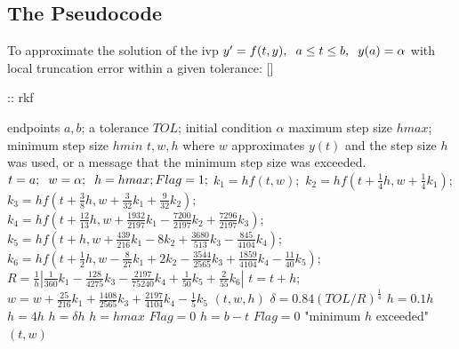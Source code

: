\documentclass[12pt,oneside]{book}
\begin{document}
\begin{spacing}{1.2}
			\subsection*{The Pseudocode} 
				To approximate the solution of the \ac{ivp}  $ y' = f(t,y), \hspace*{0.2cm} a \leq t \leq b, \hspace*{0.2cm} y(a) = \alpha $
				with local truncation error within a given tolerance: []
				
				\begin{algorithm}[H]
					\caption{:: \ac{rkf}}
					\begin{algorithmic}[1]
						\REQUIRE endpoints $ a, b $; \hspace*{0.2cm} a tolerance $ TOL $; \hspace*{0.2cm} initial condition $ \alpha $ \hspace*{0.2cm} maximum step size $ hmax $; \hspace*{0.2cm} minimum step size $ hmin $
						\ENSURE $ t, w, h $ where $ w $ approximates $ y(t) $ and the step size $ h $ was used, or a message that the minimum step size was exceeded.
						\STATE $ t = a; \hspace*{0.2cm} w = \alpha; \hspace*{0.2cm} h = hmax; Flag=1; $
							\STATE $ k_1 = hf(t,w); $
							\STATE $ k_2 = hf(t + \frac{1}{4}h, w + \frac{1}{4}k_1); $
							\STATE $ k_3 = hf(t + \frac{3}{8}h, w + \frac{3}{32}k_1 + \frac{9}{32}k_2); $
							\STATE $ k_4 = hf(t + \frac{12}{13}h, w + \frac{1932}{2197}k_1 - \frac{7200}{2197}k_2 + \frac{7296}{2197}k_3); $
							\STATE $ k_5 = hf(t + h, w + \frac{439}{216}k_1 - 8k_2 + \frac{3680}{513}k_3 - \frac{845}{4104}k_4); $
							\STATE $ k_6 = hf(t + \frac{1}{2}h, w - \frac{8}{27}k_1 + 2k_2 - \frac{3544}{2565}k_3 + \frac{1859}{4104}k_4 - \frac{11}{40}k_5); $
							\STATE $ R = \frac{1}{h} | \frac{1}{360}k_1 - \frac{128}{4275}k_3 - \frac{2197}{75240}k_4 + \frac{1}{50}k_5 + \frac{2}{55}k_6 | $ \hspace*{0.5cm} 
								\STATE $ t = t + h; $
								\STATE $ w = w + \frac{25}{216}k_1 + \frac{1408}{2565}k_3 + \frac{2197}{4104}k_4 - \frac{1}{5}k_5 $
								\RETURN $ (t, w, h) $
							\ENDIF
							\STATE $ \delta = 0.84 (TOL/R)^{\frac{1}{4}} $
								\STATE $ h = 0.1h $\hspace*{0.5cm} 
								\STATE $ h = 4h $
							\ELSE
								\STATE $ h = \delta h $
							\ENDIF
								\STATE $ h = hmax $
							\ENDIF
								\STATE $ Flag = 0 $
								\STATE $ h = b - t $
								\STATE $ Flag = 0 $
								\PRINT "minimum $ h $ exceeded" \hspace*{0.5cm} 
							\ENDIF
						\ENDWHILE
						\RETURN $ (t, w) $
					\end{algorithmic}
				\end{algorithm}
			

\end{spacing}
\end{document}
